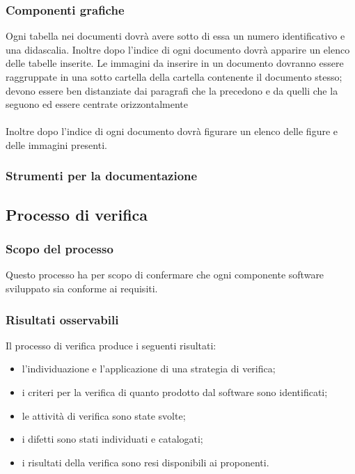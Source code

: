 \documentclass[a4paper,11pt]{article}
\begin{document}
			\subsubsection{Componenti grafiche}
				Ogni tabella nei documenti dovrà avere sotto di essa un numero identificativo e una didascalia. Inoltre dopo l'indice di ogni documento dovrà apparire un elenco delle tabelle inserite.
					Le immagini da inserire in un documento dovranno essere raggruppate in una sotto cartella della cartella contenente il documento stesso; devono essere ben distanziate dai paragrafi che la precedono e da quelli che la seguono ed essere centrate orizzontalmente \\ \\ 
					 Inoltre dopo l'indice di ogni documento dovrà figurare un elenco delle figure e delle immagini presenti.
					 
			\subsubsection{Strumenti per la documentazione}
				
			\subsection{Processo di verifica}
				\subsubsection{Scopo del processo}
					Questo processo ha per scopo di confermare che ogni componente software sviluppato sia conforme ai requisiti.		
				\subsubsection{Risultati osservabili}
				Il processo di verifica produce i seguenti risultati:
				\begin{itemize}
					\item l'individuazione e l'applicazione di una strategia di verifica;
					\item i criteri per la verifica di quanto prodotto dal software sono identificati;
					\item le attività di verifica sono state svolte;
					\item i difetti sono stati individuati e catalogati;
					\item i risultati della verifica sono resi disponibili ai proponenti.
				\end{itemize}
				
\end{document}
